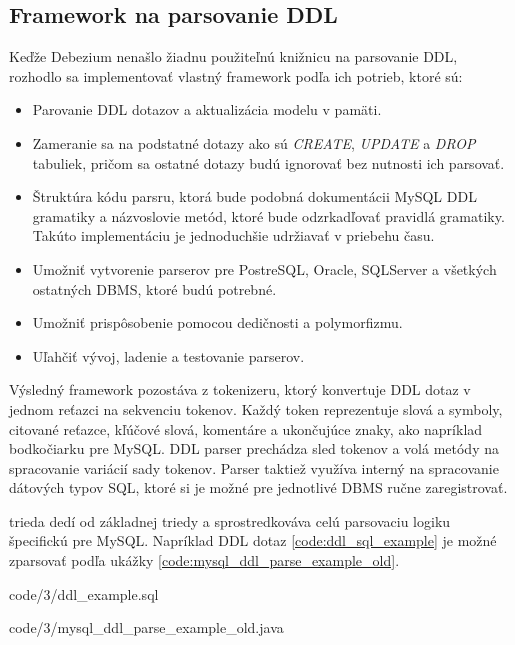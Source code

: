 \subsection{Framework na parsovanie DDL}
Keďže Debezium nenašlo žiadnu použiteľnú knižnicu na parsovanie DDL, rozhodlo sa implementovať vlastný framework podľa ich potrieb, ktoré sú\cite{debezium:parse_ddl}:
\begin{itemize}
\item Parovanie DDL dotazov a aktualizácia modelu v pamäti. 
\item Zameranie sa na podstatné dotazy ako sú \textit{CREATE}, \textit{UPDATE} a \textit{DROP} tabuliek, pričom sa ostatné dotazy budú ignorovať bez nutnosti ich parsovať.
\item Štruktúra kódu parsru, ktorá bude podobná dokumentácii MySQL DDL gramatiky a názvoslovie metód, ktoré bude odzrkadľovať pravidlá gramatiky. Takúto implementáciu je jednoduchšie udržiavať v priebehu času.
\item Umožniť vytvorenie parserov pre PostreSQL, Oracle, SQLServer a všetkých ostatných DBMS, ktoré budú potrebné.
\item Umožniť prispôsobenie pomocou dedičnosti a polymorfizmu.
\item Uľahčiť vývoj, ladenie a testovanie parserov.
\end{itemize}

Výsledný framework pozostáva z tokenizeru, ktorý konvertuje DDL dotaz v jednom reťazci na sekvenciu tokenov. Každý token reprezentuje slová a symboly, citované reťazce, kľúčové slová, komentáre a ukončujúce znaky, ako napríklad bodkočiarku pre MySQL. DDL parser prechádza sled tokenov a volá metódy na spracovanie variácií sady tokenov. Parser taktiež využíva interný  na spracovanie dátových typov SQL, ktoré si je možné pre jednotlivé DBMS ručne zaregistrovať.

 trieda dedí od základnej triedy  a sprostredkováva celú parsovaciu logiku špecifickú pre MySQL. Napríklad DDL dotaz \ref{code:ddl_sql_example} je možné zparsovať podľa ukážky \ref{code:mysql_ddl_parse_example_old}.


            {code/3/ddl_example.sql}
            

            {code/3/mysql_ddl_parse_example_old.java}
            
